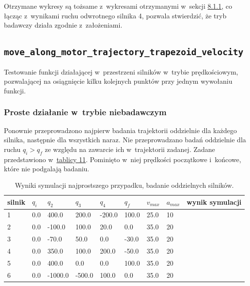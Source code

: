 \documentclass[a4paper, 12pt]{article}
\begin{document}
	Otrzymane wykresy są tożsame z~wykresami otrzymanymi w~sekcji \hyperref[sec:MPV]{8.1.1}, co łącząc z~wynikami ruchu odwrotnego silnika 4, pozwala stwierdzić, że tryb badawczy działa zgodnie z~założeniami. 

	\subsection{\texttt{move\_along\_motor\_trajectory\_trapezoid\_velocity}}
	Testowanie funkcji działającej w~przestrzeni silników w~trybie prędkościowym, pozwalającej na osiągnięcie kilku kolejnych punktów przy jednym wywołaniu funkcji. 
	\subsubsection{Proste działanie w~trybie niebadawczym}
	\label{sec:MTV}
	Ponownie przeprowadzono najpierw badania trajektorii oddzielnie dla każdego silnika, następnie dla wszystkich naraz. Nie przeprowadzano badań oddzielnie dla ruchu $ q_i>q_f $ ze względu na zawarcie ich w~trajektorii zadanej. Zadane przedstawiono w~\hyperref[tab:setup5]{tablicy 11}. Pominięto w~niej prędkości początkowe i~końcowe, które nie podgalają badaniu.
	
	\begin{table}[H]
	\centering
	\begin{tabular}{|m{2.5em}|m{3em}|m{3.5em}|m{3em}|m{3em}|m{3em}|m{4em}|m{3em}|m{5em}|}
	\hline
	silnik&$ q_i $ & $ q_2 $ & $ q_3 $ & $q_4$ & $ q_f $ & $ v_{max} $ & $ a_{max} $&wynik symulacji\\
	\hline
	\hline
	\hspace{1em}1& 0.0 & 400.0 & 200.0 & -200.0 & 100.0 & 25.0 & 10&\hspace{2em}\checkmark\\ %
	\hline
	\hspace{1em}2& 0.0 & -100.0 & 100.0 & 20.0 & 0.0 & 35.0 & 20&\hspace{2em}\checkmark\\ %
	\hline
	\hspace{1em}3& 0.0 & -70.0 & 50.0 & 0.0 & -30.0 & 35.0 & 20&\hspace{2em}\checkmark\\ %
	\hline
	\hspace{1em}4& 0.0 & 350.0 & 100.0 & 200.0 & -50.0 & 35.0 & 20&\hspace{2em}\checkmark\\  %
	\hline
	\hspace{1em}5& 0.0 & 400.0 & 0.0 & 0.0 & 100.0 & 35.0 & 20&\hspace{2em}\checkmark\\  %
	\hline
	\hspace{1em}6& 0.0 & -1000.0 & -500.0 & 100.0 & 0.0 & 35.0 & 20&\hspace{2em}\checkmark\\  %
	\hline
	\end{tabular}
	\caption{Wyniki symulacji najprostszego przypadku, badanie oddzielnych silników.}
	\label{tab:setup5}
	\end{table}	
	
\end{document}
